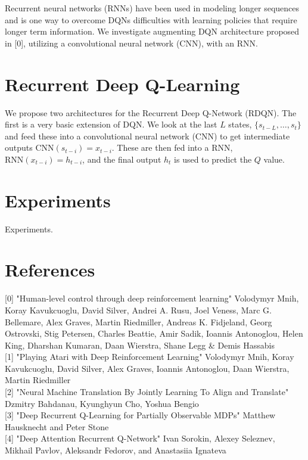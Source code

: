 \documentclass{article}
\begin{document}
    Recurrent neural networks (RNNs) have been used in modeling longer sequences and
    is one way to overcome DQNs difficulties with learning policies that require longer
    term information. We investigate augmenting DQN architecture proposed in [0], utilizing
    a convolutional neural network (CNN), with an RNN.

\section{Recurrent Deep Q-Learning}
We propose two architectures for the Recurrent Deep Q-Network (RDQN). The first
is a very basic extension of DQN. We look at the last $L$ states, $\{s_{t-L},
\dots, s_{t}\}$ and feed these into a convolutional neural network (CNN) to get
intermediate outputs $\text{CNN}(s_{t-i}) = x_{t-i}$. These are then fed into a
RNN, $\text{RNN}(x_{t-i}) = h_{t-i}$, and the final output $h_t$ is used to
predict the $Q$ value.
\section{Experiments}
Experiments.

\section*{References}
\small
[0] "Human-level control through deep reinforcement learning" Volodymyr Mnih, Koray Kavukcuoglu, David Silver, Andrei A. Rusu, Joel Veness, Marc G. Bellemare, Alex Graves, Martin Riedmiller, Andreas K. Fidjeland, Georg Ostrovski, Stig Petersen, Charles Beattie, Amir Sadik, Ioannis Antonoglou, Helen King, Dharshan Kumaran, Daan Wierstra, Shane Legg \& Demis Hassabis \\

[1] "Playing Atari with Deep Reinforcement Learning" Volodymyr Mnih, Koray Kavukcuoglu, David Silver, Alex Graves, Ioannis Antonoglou, Daan Wierstra, Martin Riedmiller \\

[2] "Neural Machine Translation By Jointly Learning To Align and Translate" Dzmitry Bahdanau, Kyunghyun Cho, Yoshua Bengio \\

[3] "Deep Recurrent Q-Learning for Partially Observable MDPs" Matthew Hausknecht and Peter Stone \\

[4] "Deep Attention Recurrent Q-Network" Ivan Sorokin, Alexey Seleznev, Mikhail Pavlov, Aleksandr Fedorov, and Anastasiia Ignateva \\
\end{document}
